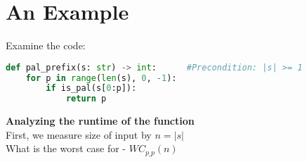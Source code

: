 \documentclass[12pt, letterpaper, twoside]{article}
\begin{document}

\section{An Example}
Examine the code:
\begin{lstlisting}[language=Python]
def pal_prefix(s: str) -> int:      #Precondition: |s| >= 1
    for p in range(len(s), 0, -1):
        if is_pal(s[0:p]):
            return p
\end{lstlisting}
\textbf{Analyzing the runtime of the function}\\
First, we measure size of input  by $n = |s|$ \\

What is the worst case for  - $WC_{p\_p}(n)$
\end{document}
